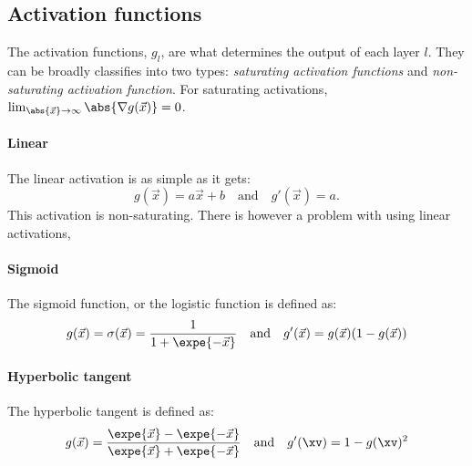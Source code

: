     \subsection{Activation functions}
        The activation functions, $g_l$, are what determines the output of each layer $l$. They can be broadly classifies into two types: \textit{saturating activation functions} and \textit{non-saturating activation function}. For saturating activations, $\lim_{\abs{\vec{x}}\to\infty}\abs{\nabla g(\vec{x})} = 0$. 
        \paragraph{Linear}
            The linear activation is as simple as it gets:
            \begin{equation}
                g(\vec{x}) = a\vec{x} + b \quad \mathrm{and} \quad g'(\vec{x}) = a.
            \end{equation}
            This activation is non-saturating. There is however a problem with using linear activations, 

        \paragraph{Sigmoid}
            The sigmoid function, or the logistic function is defined as: 
            \begin{equation}
                g(\vec{x}) = \sigma(\vec{x}) = \frac{1}{1+\expe{-\vec{x}}} \quad \mathrm{and} \quad g'(\vec{x}) = g(\vec{x})(1-g(\vec{x}))
            \end{equation}


        \paragraph{Hyperbolic tangent}
            The hyperbolic tangent is defined as:
            \begin{equation}
                g(\vec{x}) = \frac{\expe{\vec{x}}-\expe{-\vec{x}}}{\expe{\vec{x}}+\expe{-\vec{x}}} \quad \mathrm{and} \quad g'(\xv)=1-g(\xv)^2
            \end{equation}

